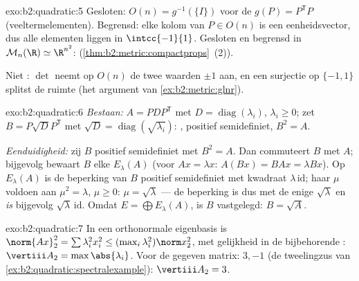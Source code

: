 \begin{solution}{exo:b2:quadratic:5}
Gesloten: $O(n) = g^{-1}(\{I\})$ voor de  $g(P) =
P^{\mathsf T}P$ (veeltermelementen). Begrensd: elke kolom van $P
\in O(n)$ is een eenheidsvector, dus alle elementen liggen in
$\intcc{-1}{1}$. Gesloten en begrensd in $\mathcal{M}_n(\R) \simeq
\R^{n^2}$:  (\cref{thm:b2:metric:compactprops}~(2)).

Niet : $\det$ neemt op $O(n)$ de twee waarden $\pm1$
aan, en een  surjectie op $\{-1, 1\}$ splitst de ruimte
(het argument van \cref{ex:b2:metric:glnr}).
\end{solution}

\begin{solution}{exo:b2:quadratic:6}
\emph{Bestaan:} $A = PDP^{\mathsf T}$ met $D =
\operatorname{diag}(\lambda_i)$, $\lambda_i \geq 0$; zet $B =
P\sqrt D P^{\mathsf T}$ met $\sqrt D =
\operatorname{diag}(\sqrt{\lambda_i})$: , positief
semidefiniet, $B^2 = A$.

\emph{Eenduidigheid:} zij $B$  positief semidefiniet met
$B^2 = A$. Dan commuteert $B$ met $A$; bijgevolg bewaart $B$ elke
 $E_\lambda(A)$ (voor $Ax = \lambda x$: $A(Bx) = BAx =
\lambda Bx$). Op $E_\lambda(A)$ is de beperking van $B$
 positief semidefiniet met kwadraat
$\lambda\,\mathrm{id}$; haar  $\mu$ voldoen aan $\mu^2
= \lambda$, $\mu \geq 0$: $\mu = \sqrt\lambda$ --- de beperking is
dus  met de enige  $\sqrt\lambda$ en
\emph{is} bijgevolg $\sqrt\lambda\,\mathrm{id}$. Omdat $E =
\bigoplus E_\lambda(A)$, is $B$ vastgelegd: $B = \sqrt A$.
\end{solution}

\begin{solution}{exo:b2:quadratic:7}
In een orthonormale eigenbasis is $\norm{Ax}_2^2 = \sum \lambda_i^2
x_i^2 \leq (\max_i \lambda_i^2)\norm x_2^2$, met gelijkheid in de
bijbehorende : $\vertiii A_2 = \max\abs{\lambda_i}$.
Voor de gegeven matrix:  $3, -1$ (de tweelingzus van
\cref{ex:b2:quadratic:spectralexample}): $\vertiii A_2 = 3$.
\end{solution}

